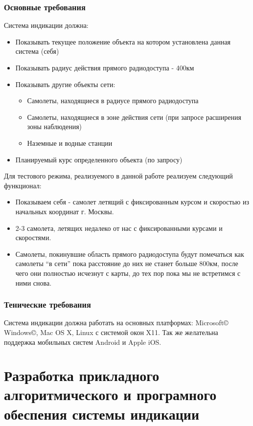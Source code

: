 \documentclass[a4paper,12pt]{report} %
\begin{document}
\subsection{Основные требования}
Система индикации должна:
\begin{itemize}
\item Показывать текущее положение объекта на котором установлена данная система
  (себя)
\item Показывать радиус действия прямого радиодоступа - 400км
\item Показывать другие объекты сети:
  \begin{itemize}
  \item Самолеты, находящиеся в радиусе прямого радиодоступа
  \item Самолеты, находящиеся в зоне действия сети (при запросе расширения зоны
    наблюдения)
  \item Наземные и водные станции
  \end{itemize}
\item Планируемый курс определенного объекта (по запросу)
\end{itemize}

Для тестового режима, реализуемого в данной работе реализуем следующий
функционал:
\begin{itemize}
\item Показываем себя - самолет летящий с фиксированным курсом и скоростью из
  начальных координат г. Москвы.
\item 2-3 самолета, летящих недалеко от нас с фиксированными курсами и
  скоростями.
\item Самолеты, покинувшие область прямого радиодоступа будут помечаться как
  самолеты ``в сети'' пока расстояние до них не станет больше 800км, после чего
  они полностью исчезнут с карты, до тех пор пока мы не встретимся с ними снова.
\end{itemize}

\subsection{Тенические требования}
Система индикации должна работать на основных платформах: Microsoft\copyright
Windows\copyright, Mac OS X, Linux с системой окон X11. Так же желательна
поддержка мобильных систем Android и Apple iOS.
\newpage

\chapter{Разработка прикладного алгоритмического и \newline програмного
  обеспения  системы индикации} %
\end{document}
